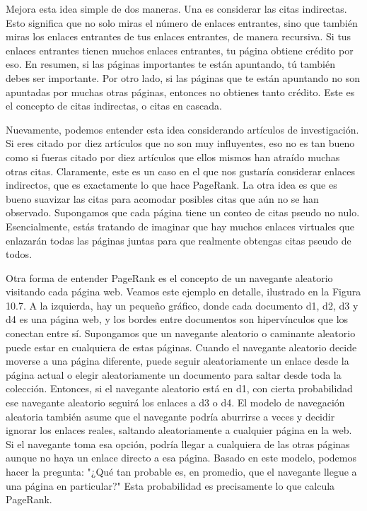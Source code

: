 Mejora esta idea simple de dos maneras. Una es considerar las citas indirectas. Esto significa que no solo miras el número de enlaces entrantes, sino que también miras los enlaces entrantes de tus enlaces entrantes, de manera recursiva. Si tus enlaces entrantes tienen muchos enlaces entrantes, tu página obtiene crédito por eso. En resumen, si las páginas importantes te están apuntando, tú también debes ser importante. Por otro lado, si las páginas que te están apuntando no son apuntadas por muchas otras páginas, entonces no obtienes tanto crédito. Este es el concepto de citas indirectas, o citas en cascada.

Nuevamente, podemos entender esta idea considerando artículos de investigación. Si eres citado por diez artículos que no son muy influyentes, eso no es tan bueno como si fueras citado por diez artículos que ellos mismos han atraído muchas otras citas. Claramente, este es un caso en el que nos gustaría considerar enlaces indirectos, que es exactamente lo que hace PageRank. La otra idea es que es bueno suavizar las citas para acomodar posibles citas que aún no se han observado. Supongamos que cada página tiene un conteo de citas pseudo no nulo. Esencialmente, estás tratando de imaginar que hay muchos enlaces virtuales que enlazarán todas las páginas juntas para que realmente obtengas citas pseudo de todos.

Otra forma de entender PageRank es el concepto de un navegante aleatorio visitando cada página web. Veamos este ejemplo en detalle, ilustrado en la Figura 10.7. A la izquierda, hay un pequeño gráfico, donde cada documento d1, d2, d3 y d4 es una página web, y los bordes entre documentos son hipervínculos que los conectan entre sí. Supongamos que un navegante aleatorio o caminante aleatorio puede estar en cualquiera de estas páginas. Cuando el navegante aleatorio decide moverse a una página diferente, puede seguir aleatoriamente un enlace desde la página actual o elegir aleatoriamente un documento para saltar desde toda la colección. Entonces, si el navegante aleatorio está en d1, con cierta probabilidad ese navegante aleatorio seguirá los enlaces a d3 o d4. El modelo de navegación aleatoria también asume que el navegante podría aburrirse a veces y decidir ignorar los enlaces reales, saltando aleatoriamente a cualquier página en la web. Si el navegante toma esa opción, podría llegar a cualquiera de las otras páginas aunque no haya un enlace directo a esa página. Basado en este modelo, podemos hacer la pregunta: "¿Qué tan probable es, en promedio, que el navegante llegue a una página en particular?" Esta probabilidad es precisamente lo que calcula PageRank.

